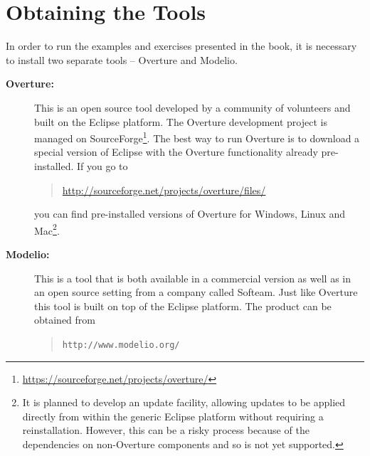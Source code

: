 \section{Obtaining the Tools}\label{sec:install}

In order to run the examples and exercises presented in the book, it
is necessary to install two separate tools -- Overture and Modelio.
\begin{description}
\item[\textbf{Overture:}] This is an open source tool developed by a
  community of volunteers and built on the Eclipse platform. The
  Overture development project is managed on
  SourceForge\footnote{\url{https://sourceforge.net/projects/overture/}}.
The best way to run Overture is to download a special version of
  Eclipse with the Overture functionality already
  pre-installed. If you go to
  \begin{quote}
  \url{http://sourceforge.net/projects/overture/files/}
  \end{quote}
  \noindent you can find pre-installed versions of Overture for
  Windows, Linux and Mac\footnote{It is planned to develop an update facility,
  allowing updates to be applied directly from within the generic
  Eclipse platform without requiring a reinstallation. However, this can be a
  risky process because of the dependencies on non-Overture components
  and so is not yet supported.}.

\item[\textbf{Modelio:}] This is a tool that is both available in a commercial version as well as in an open source setting from a
  company called Softeam. Just like Overture this tool is built on top of the Eclipse platform. The product can be
  obtained from
\begin{quote}
\texttt{http://www.modelio.org/}
\end{quote}


\end{description}
